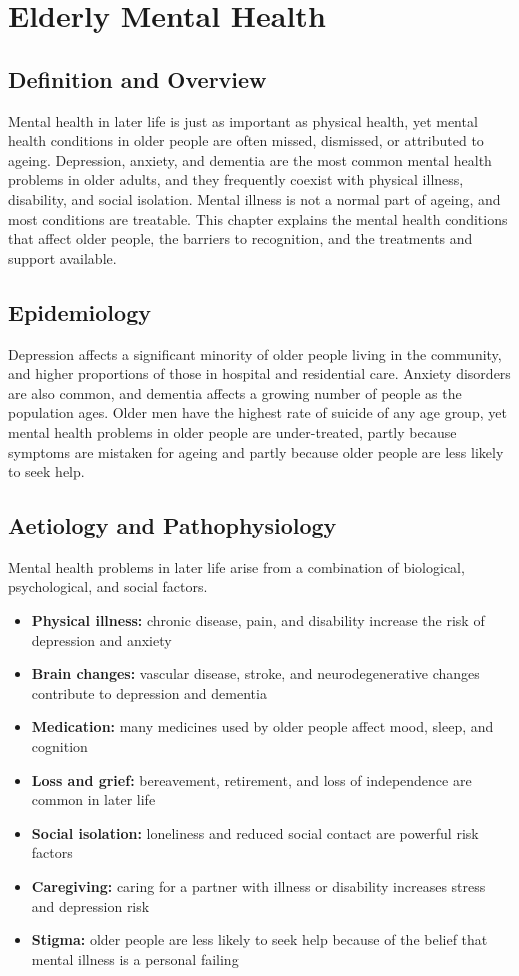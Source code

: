 \chapter{Elderly Mental Health}

\section*{Definition and Overview}
Mental health in later life is just as important as physical health, yet mental health conditions in older people are often missed, dismissed, or attributed to ageing. Depression, anxiety, and dementia are the most common mental health problems in older adults, and they frequently coexist with physical illness, disability, and social isolation. Mental illness is not a normal part of ageing, and most conditions are treatable. This chapter explains the mental health conditions that affect older people, the barriers to recognition, and the treatments and support available.

\section*{Epidemiology}
Depression affects a significant minority of older people living in the community, and higher proportions of those in hospital and residential care. Anxiety disorders are also common, and dementia affects a growing number of people as the population ages. Older men have the highest rate of suicide of any age group, yet mental health problems in older people are under-treated, partly because symptoms are mistaken for ageing and partly because older people are less likely to seek help.

\section*{Aetiology and Pathophysiology}
Mental health problems in later life arise from a combination of biological, psychological, and social factors.
\begin{itemize}
    \item \textbf{Physical illness:} chronic disease, pain, and disability increase the risk of depression and anxiety
    \item \textbf{Brain changes:} vascular disease, stroke, and neurodegenerative changes contribute to depression and dementia
    \item \textbf{Medication:} many medicines used by older people affect mood, sleep, and cognition
    \item \textbf{Loss and grief:} bereavement, retirement, and loss of independence are common in later life
    \item \textbf{Social isolation:} loneliness and reduced social contact are powerful risk factors
    \item \textbf{Caregiving:} caring for a partner with illness or disability increases stress and depression risk
    \item \textbf{Stigma:} older people are less likely to seek help because of the belief that mental illness is a personal failing
\end{itemize}

